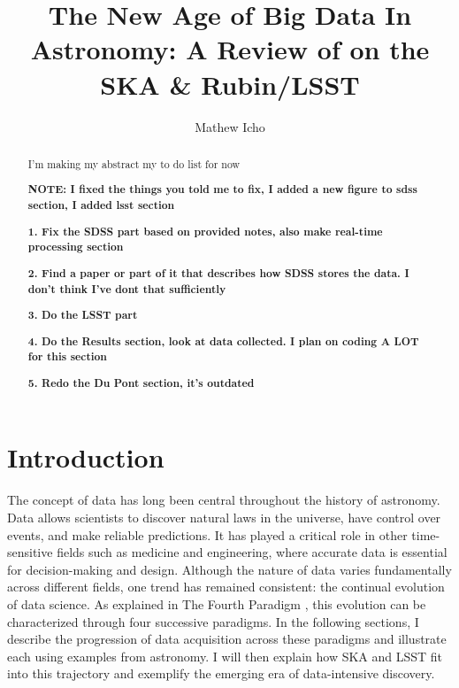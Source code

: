 \documentclass[preprint,linenumbers, longauthor]{aastex631}
\begin{document}
\title{The New Age of Big Data In Astronomy: A Review of on the SKA \& Rubin/LSST}
\author{Mathew Icho}

\begin{abstract}
I'm making my abstract my to do list for now

\textbf{NOTE: I fixed the things you told me to fix, I added a new figure to sdss section, I added lsst section}


\textbf{1. Fix the SDSS part based on provided notes, also make real-time processing section}

\textbf{2. Find a paper or part of it that describes how SDSS stores the data. I don't think I've dont that sufficiently}

\textbf{3. Do the LSST part}

\textbf{4. Do the Results section, look at data collected. I plan on coding A LOT for this section}

\textbf{5. Redo the Du Pont section, it's outdated}

\end{abstract}

\tableofcontents

\section{Introduction}
The concept of data has long been central throughout the history of astronomy. Data allows scientists to discover natural laws in the universe, have control over events, and make reliable predictions. It has played a critical role in other time-sensitive fields such as medicine and engineering, where accurate data is essential for decision-making and design. 
Although the nature of data varies fundamentally across different fields, one trend has remained consistent: the continual evolution of data science. As explained in The Fourth Paradigm \citep{heyFourthParadigmDataIntensive2009}, this evolution can be characterized through four successive paradigms. 
In the following sections, I describe the progression of data acquisition across these paradigms and illustrate each using examples from astronomy. I will then explain how SKA and LSST fit into this trajectory and exemplify the emerging era of data-intensive discovery.
\end{document}
